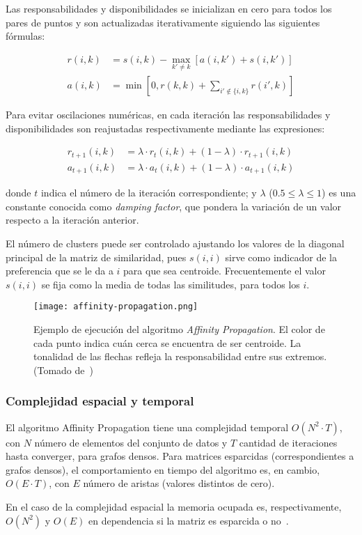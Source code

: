 Las responsabilidades y disponibilidades se inicializan en cero para todos los pares de puntos y son actualizadas iterativamente siguiendo las siguientes fórmulas:

\begin{align}
    \label{eq:responsibility}
    r(i,k) &= s(i,k) - \max_{k' \neq k}\left[ a(i, k') + s(i,k') \right] \\
    \label{eq:availability}
    a(i, k) &= \min\left[ 0, r(k,k) + \sum_{i'\notin \{i, k\}}{r(i', k)} \right]
\end{align}

Para evitar oscilaciones numéricas, en cada iteración las responsabilidades y disponibilidades son reajustadas respectivamente mediante las expresiones:

\begin{align}
    \label{eq:responsibility-damping}
    r_{t+1}(i,k) &= \lambda \cdot r_t (i,k) + (1-\lambda)\cdot r_{t+1}(i,k) \\
    \label{eq:availability-damping}
    a_{t+1}(i,k) &= \lambda \cdot a_t (i,k) + (1-\lambda)\cdot a_{t+1}(i,k)
\end{align}

\noindent
donde $t$ indica el número de la iteración correspondiente;
y $\lambda$ ($0.5 \leq \lambda \leq 1$) es una constante conocida como \textit{damping factor}, que pondera la variación de un valor respecto a la iteración anterior.

El número de clusters puede ser controlado ajustando los valores de la diagonal principal de la matriz de similaridad, pues $s(i,i)$ sirve como indicador de la preferencia que se le da a $i$ para que sea centroide.
Frecuentemente el valor $s(i,i)$ se fija como la media de todas las similitudes, para todos los $i$.

\begin{figure}[!h]
    \centering
    \texttt{[image: affinity-propagation.png]}
    \caption{Ejemplo de ejecución del algoritmo \textit{Affinity Propagation}. El color de cada punto indica cuán cerca se encuentra de ser centroide. La tonalidad de las flechas refleja la responsabilidad entre sus extremos. (Tomado de~\cite{Murphy12})}
    \label{img:affinity-propagation}
\end{figure}

\subsubsection{Complejidad espacial y temporal}

El algoritmo Affinity Propagation tiene una complejidad temporal $O(N^2 \cdot T)$, con $N$ número de elementos del conjunto de datos y $T$ cantidad de iteraciones hasta converger, para grafos densos.
Para matrices esparcidas (correspondientes a grafos densos), el comportamiento en tiempo del algoritmo es, en cambio, $O(E\cdot T)$, con $E$ número de aristas (valores distintos de cero).

En el caso de la complejidad espacial la memoria ocupada es, respectivamente, $O(N^2)$ y $O(E)$ en dependencia si la matriz es esparcida o no~\cite{Murphy12}.

